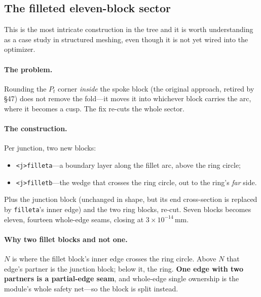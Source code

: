 \documentclass[11pt,a4paper]{article}
\DeclareRobustCommand{\code}[1]{%
  \texttt{\small\def\_{\textunderscore\discretionary{}{}{}}#1}}
\begin{document}
\subsection{The filleted eleven-block sector}
\label{sec:filletblock}

This is the most intricate construction in the tree and it is worth understanding as a
case study in structured meshing, even though it is not yet wired into the optimizer.

\paragraph{The problem.}
Rounding the $P_t$ corner \emph{inside} the spoke block (the original approach, retired
by \S47) does not remove the fold---it moves it into whichever block carries the arc,
where it becomes a cusp. The fix re-cuts the whole sector.

\paragraph{The construction.}
Per junction, two new blocks:

\begin{itemize}
\item \code{<j>\_fillet\_a}---a boundary layer along the fillet arc, above the ring
  circle;
\item \code{<j>\_fillet\_b}---the wedge that crosses the ring circle, out to the ring's
  \emph{far} side.
\end{itemize}

Plus the junction block (unchanged in shape, but its end cross-section is replaced by
\code{fillet\_a}'s inner edge) and the two ring blocks, re-cut. Seven blocks becomes
eleven, fourteen whole-edge seams, closing at $3\times10^{-14}$\,mm.

\paragraph{Why two fillet blocks and not one.}
$N$ is where the fillet block's inner edge crosses the ring circle. Above $N$ that
edge's partner is the junction block; below it, the ring. \textbf{One edge with two
partners is a partial-edge seam}, and whole-edge single ownership is the module's whole
safety net---so the block is split instead.
\end{document}
